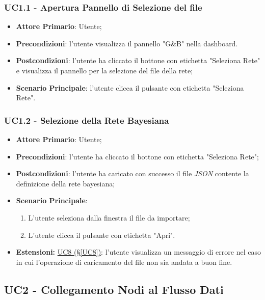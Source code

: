 \pagebreak

\subsubsection{UC1.1 - Apertura Pannello di Selezione del file}\label{UC1.1}
\begin{itemize}
	\item \textbf{Attore Primario}: Utente; 
	\item \textbf{Precondizioni}: l'utente visualizza il pannello "G\&B" nella dashboard.
	\item \textbf{Postcondizioni}: l'utente ha cliccato il bottone con etichetta "Seleziona Rete" e visualizza il pannello per la selezione del file della rete;
	\item \textbf{Scenario Principale}: l'utente clicca il pulsante con etichetta "Seleziona Rete".
\end{itemize}


\subsubsection{UC1.2 - Selezione della Rete Bayesiana}\label{UC1.2}
\begin{itemize}
	\item \textbf{Attore Primario}: Utente;
	\item \textbf{Precondizioni}: l'utente ha cliccato il bottone con etichetta "Seleziona Rete";
	\item \textbf{Postcondizioni}: l'utente ha caricato con successo il file \textit{JSON} contente la definizione della rete bayesiana;
	\item \textbf{Scenario Principale}:
	\begin{enumerate}
		\item L'utente seleziona dalla finestra il file da importare;
		\item L'utente clicca il pulsante con etichetta "Apri".
	\end{enumerate}
	\item \textbf{Estensioni:} \hyperref[UC8]{UC8 (§\ref*{UC8})}: l'utente visualizza un messaggio di errore nel caso in cui l'operazione di caricamento del file non sia andata a buon fine.
\end{itemize}

\pagebreak

\subsection{UC2 - Collegamento Nodi al Flusso Dati}\label{UC2}


